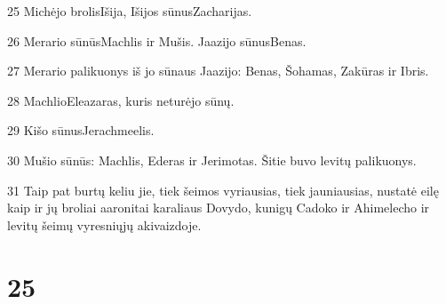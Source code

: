\par 25 Michėjo brolis­Išija, Išijos sūnus­Zacharijas. 
\par 26 Merario sūnūs­Machlis ir Mušis. Jaazijo sūnus­Benas. 
\par 27 Merario palikuonys iš jo sūnaus Jaazijo: Benas, Šohamas, Zakūras ir Ibris. 
\par 28 Machlio­Eleazaras, kuris neturėjo sūnų. 
\par 29 Kišo sūnus­Jerachmeelis. 
\par 30 Mušio sūnūs: Machlis, Ederas ir Jerimotas. Šitie buvo levitų palikuonys. 
\par 31 Taip pat burtų keliu jie, tiek šeimos vyriausias, tiek jauniausias, nustatė eilę kaip ir jų broliai aaronitai karaliaus Dovydo, kunigų Cadoko ir Ahimelecho ir levitų šeimų vyresniųjų akivaizdoje.



\chapter{25}


